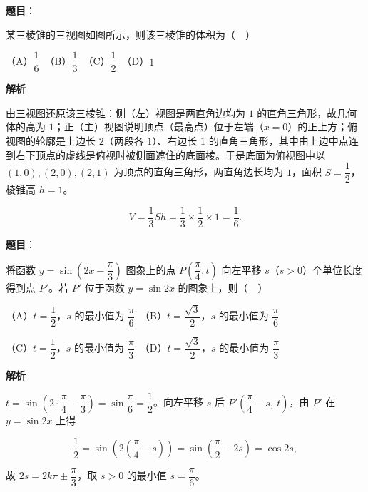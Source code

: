 \begin{answer}

\textbf{题目}：

某三棱锥的三视图如图所示，则该三棱锥的体积为（　）
\nopagebreak[4]
\begin{center}\end{center}
\nopagebreak[4]
（A）\(\dfrac{1}{6}\)　（B）\(\dfrac{1}{3}\)　（C）\(\dfrac{1}{2}\)　（D）\(1\)

\textbf{解析}

由三视图还原该三棱锥：侧（左）视图是两直角边均为 \(1\) 的直角三角形，故几何体的高为 \(1\)；正（主）视图说明顶点（最高点）位于左端（\(x=0\)）的正上方；俯视图的轮廓是上边长 \(2\)（两段各 \(1\)）、右边长 \(1\) 的直角三角形，其中由上边中点连到右下顶点的虚线是俯视时被侧面遮住的底面棱。于是底面为俯视图中以 \((1,0),(2,0),(2,1)\) 为顶点的直角三角形，两直角边长均为 \(1\)，面积 \(S=\dfrac12\)，棱锥高 \(h=1\)。

\nopagebreak[4]
\[
V=\frac13Sh=\frac13\times\frac12\times1=\frac16.
\]


\end{answer}
\begin{answer}

\textbf{题目}：

将函数 \(y=\sin\left(2x-\dfrac{\pi}{3}\right)\) 图象上的点 \(P\left(\dfrac{\pi}{4},t\right)\) 向左平移 \(s\)（\(s>0\)）个单位长度得到点 \(P'\)。若 \(P'\) 位于函数 \(y=\sin 2x\) 的图象上，则（　）

（A）\(t=\dfrac{1}{2}\)，\(s\) 的最小值为 \(\dfrac{\pi}{6}\)　（B）\(t=\dfrac{\sqrt{3}}{2}\)，\(s\) 的最小值为 \(\dfrac{\pi}{6}\)

（C）\(t=\dfrac{1}{2}\)，\(s\) 的最小值为 \(\dfrac{\pi}{3}\)　（D）\(t=\dfrac{\sqrt{3}}{2}\)，\(s\) 的最小值为 \(\dfrac{\pi}{3}\)

\textbf{解析}

\(t=\sin\left(2\cdot\dfrac{\pi}{4}-\dfrac{\pi}{3}\right)=\sin\dfrac{\pi}{6}=\dfrac12\)。向左平移 \(s\) 后 \(P'\left(\dfrac{\pi}{4}-s,\ t\right)\)，由 \(P'\) 在 \(y=\sin 2x\) 上得

\nopagebreak[4]
\[
\frac12=\sin\left(2\left(\frac{\pi}{4}-s\right)\right)=\sin\left(\frac{\pi}{2}-2s\right)=\cos 2s,
\]

故 \(2s=2k\pi\pm\dfrac{\pi}{3}\)，取 \(s>0\) 的最小值 \(s=\dfrac{\pi}{6}\)。


\end{answer}
